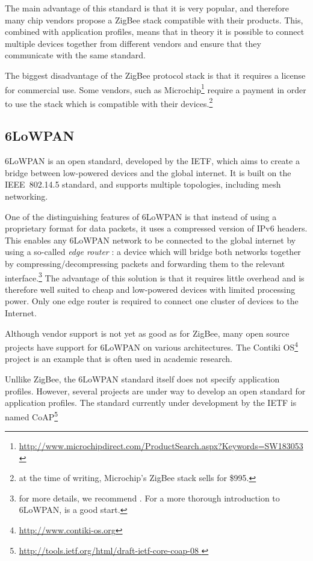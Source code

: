 The main advantage of this standard is that it is very popular, and therefore
many chip vendors propose a ZigBee stack compatible with their products. This,
combined with application profiles, means that in theory it is possible to
connect multiple devices together from different vendors and ensure that they
communicate with the same standard.

The biggest disadvantage of the ZigBee protocol stack is that it requires
a license for commercial use. Some vendors, such as Microchip\footnote{\url{
http://www.microchipdirect.com/ProductSearch.aspx?Keywords=SW183053 }} require
a payment in order to use the stack which is compatible with their
devices.\footnote{at the time of writing, Microchip's ZigBee stack sells for
\$995.}

\subsection{6LoWPAN}\label{sub:6lowpan}

\ac{6LoWPAN} is an open standard, developed by the \ac{IETF}, which aims to create
a bridge between low-powered devices and the global internet. It is built on the
IEEE~802.14.5 standard, and supports multiple topologies, including mesh
networking. 

One of the distinguishing features of 6LoWPAN is that instead of using
a proprietary format for data packets, it uses a compressed version of IPv6
headers. This enables any 6LoWPAN network to be connected to the global internet
by using a so-called \emph{edge router} : a device which will bridge both
networks together by compressing/decompressing packets and forwarding them to
the relevant interface.\footnote{for more details, we recommend \citep[sec.
6.4]{shelby2010}. For a more thorough introduction to 6LoWPAN, \citep[chap.
16]{dunkels2010} is a good start.} The advantage of this solution is that it
   requires little overhead and is therefore well suited to cheap and
   low-powered devices with limited processing power. Only one edge router is
   required to connect one cluster of devices to the Internet.

Although vendor support is not yet as good as for ZigBee, many open source
projects have support for 6LoWPAN on various architectures. The Contiki
OS\footnote{ \url{http://www.contiki-os.org} } project is an example that is
often used in academic research. 

Unllike ZigBee, the 6LoWPAN standard itself does not specify application
profiles. However, several projects are under way to develop an open standard
for application profiles. The standard currently under development by the IETF
is named \ac{CoAP}\footnote{ \url{
http://tools.ietf.org/html/draft-ietf-core-coap-08 }}


